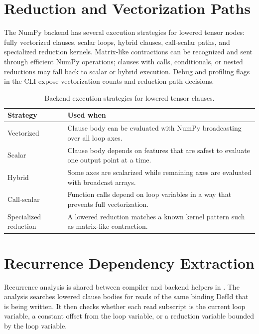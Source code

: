 \section{Reduction and Vectorization Paths}

The NumPy backend has several execution strategies for lowered tensor nodes:
fully vectorized clauses, scalar loops, hybrid clauses, call-scalar paths, and
specialized reduction kernels. Matrix-like contractions can be recognized and
sent through efficient NumPy operations; clauses with calls, conditionals, or
nested reductions may fall back to scalar or hybrid execution. Debug and
profiling flags in the CLI expose vectorization counts and reduction-path
decisions.

\begin{table}[htbp]
\centering
\caption{Backend execution strategies for lowered tensor clauses.}
\label{tab:tensor-execution-strategies}
\renewcommand{\arraystretch}{1.08}
\begin{tabular}{@{}L{0.24\textwidth}L{0.64\textwidth}@{}}
\toprule
Strategy & Used when \\
\midrule
Vectorized & Clause body can be evaluated with NumPy broadcasting over all loop axes. \\
Scalar & Clause body depends on features that are safest to evaluate one output point at a time. \\
Hybrid & Some axes are scalarized while remaining axes are evaluated with broadcast arrays. \\
Call-scalar & Function calls depend on loop variables in a way that prevents full vectorization. \\
Specialized reduction & A lowered reduction matches a known kernel pattern such as matrix-like contraction. \\
\bottomrule
\end{tabular}
\end{table}

\section{Recurrence Dependency Extraction}

Recurrence analysis is shared between compiler and backend helpers in
. The analysis searches
lowered clause bodies for reads of the same binding DefId that is being written.
It then checks whether each read subscript is the current loop variable, a
constant offset from the loop variable, or a reduction variable bounded by the
loop variable.

